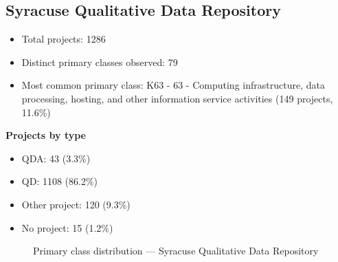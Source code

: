\subsection{Syracuse Qualitative Data Repository}

\begin{itemize}
    \item Total projects: 1286
    \item Distinct primary classes observed: 79
    \item Most common primary class: K63 - 63 - Computing infrastructure, data processing, hosting, and other information service activities (149 projects, 11.6\%)
\end{itemize}
\textbf{Projects by type}
\begin{itemize}
    \item QDA: 43 (3.3\%)
    \item QD: 1108 (86.2\%)
    \item Other project: 120 (9.3\%)
    \item No project: 15 (1.2\%)
\end{itemize}

\begin{figure}[h]
    \centering
    
    \caption{Primary class distribution --- Syracuse Qualitative Data Repository}
\end{figure}

